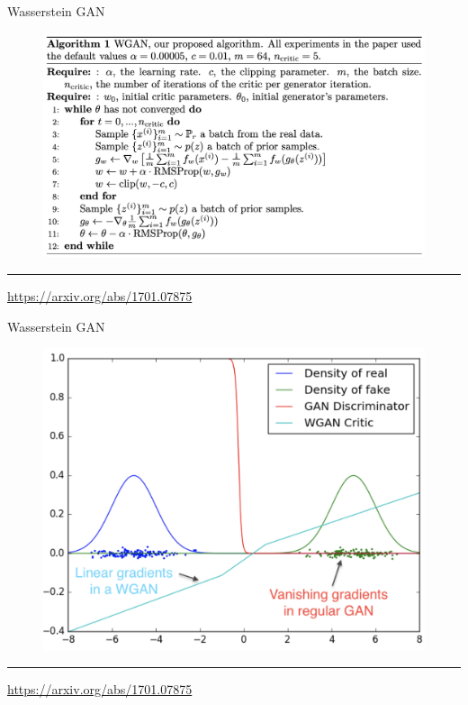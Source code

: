 \documentclass{beamer}
\begin{document}
\begin{frame}{Wasserstein GAN}
	\begin{figure}
		\centering
		\includegraphics[width=1.0\linewidth]{figs/wgan_pseudocode}
	\end{figure}
	\vfill
	\hrule\medskip 
	{\scriptsize \href{https://arxiv.org/abs/1701.07875}{https://arxiv.org/abs/1701.07875}}
\end{frame}
\begin{frame}{Wasserstein GAN}
	\begin{figure}
		\centering
		\includegraphics[width=0.8\linewidth]{figs/wgan_toy}
	\end{figure}
	\vfill
	\hrule\medskip 
	{\scriptsize \href{https://arxiv.org/abs/1701.07875}{https://arxiv.org/abs/1701.07875}}
\end{frame}
\end{document}

